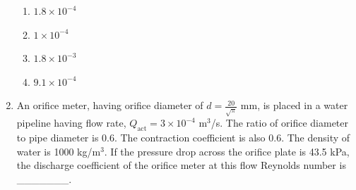 \documentclass[journal,12pt,onecolumn]{IEEEtran}
\theoremstyle{remark}
\begin{document}
\begin{enumerate}
\begin{multicols}{4}
	\begin{enumerate}
		\item $1.8 \times 10^{-4}$
		\item $1 \times 10^{-4}$
		\item $1.8 \times 10^{-3}$
		\item $9.1 \times 10^{-4}$
	\end{enumerate}
\end{multicols}

\item An orifice meter, having orifice diameter of $d = \frac{20}{\sqrt{\pi}}$ mm, is placed in a water pipeline having flow rate, $Q_{\text{act}} = 3 \times 10^{-4}$ m$^3$/s. The ratio of orifice diameter to pipe diameter is 0.6. The contraction coefficient is also 0.6. The density of water is 1000 kg/m$^3$. If the pressure drop across the orifice plate is 43.5 kPa, the discharge coefficient of the orifice meter at this flow Reynolds number is \_\_\_\_\_\_\_.

\end{enumerate}
\end{document}
